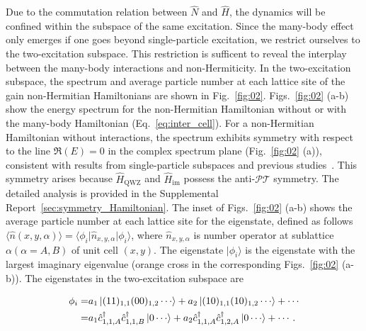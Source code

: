 \documentclass[longbibliography, aps, prx, amsmath, amssymb, amsfonts, twocolumn,superscriptaddress, footinbib]{revtex4-1}
\begin{document}
	Due to the commutation relation between $\hat{N}$ and $\hat{H}$, the dynamics will be confined within the subspace of the same excitation. Since the many-body effect only emerges if one goes beyond single-particle excitation, we restrict ourselves to the two-excitation subspace. This restriction is sufficent to reveal the interplay between the many-body interactions and non-Hermiticity. 
	In the two-excitation subspace, the spectrum and average particle number at each lattice site of the gain non-Hermitian Hamiltonians 
	are shown in Fig.~\ref{fig:02}.
	Figs.~\ref{fig:02} (a-b) show the energy spectrum
	for the non-Hermitian Hamiltonian without or with the many-body Hamiltonian (Eq.~\ref{eq:inter_cell}). 
    For a non-Hermitian Hamiltonian without interactions, the spectrum exhibits symmetry with respect to the line $\Re(E)=0$ in the complex spectrum plane (Fig.~\ref{fig:02} (a)), consistent with results from single-particle subspaces and previous studies~\cite{nakamura2023universal, ma2024non,schindler2023hermitian}. This symmetry arises because $\hat{H}_{\text{QWZ}}$ and $\hat{H}_{\text{im}}$ possess the anti-$\mathcal{PT}$ symmetry.
	The detailed analysis is provided in the Supplemental Report~\ref{sec:symmetry_Hamiltonian}.
	The inset of Figs.~\ref{fig:02} (a-b) shows the average particle number at each lattice site for the eigenstate, defined as follows $\langle \hat{n}(x,y,\alpha) \rangle = \langle \phi_i \vert \hat{n}_{x,y,\alpha} \vert \phi_i \rangle$,
	where 
	$\hat{n}_{x,y,\alpha}$ is number operator at sublattice $\alpha (\alpha=A,B)$ of unit cell $(x,y)$.
	The eigenstate $\vert \phi_i \rangle$ is the eigenstate with the largest imaginary eigenvalue (orange cross in the corresponding Figs.~\ref{fig:02} (a-b)). The eigenstates in the two-excitation subspace are
    \begin{small}
    \begin{equation}
		\begin{split}
			\phi_i =& a_1 \ket{(11)_{1,1}(00)_{1,2}\cdots} + a_2 \ket{(10)_{1,1}(10)_{1,2}\cdots} + \cdots\\
			=& a_1 \hat{c}_{1,1,A}^{\dagger}\hat{c}_{1,1,B}^{\dagger} \ket{0\cdots} + a_2 \hat{c}_{1,1,A}^{\dagger}\hat{c}_{1,2,A}^{\dagger} \ket{0\cdots} + \cdots.
		\end{split}\label{eq2}
	\end{equation}
    \end{small}
\end{document}
